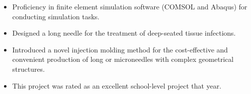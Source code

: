 \documentclass{resume}
\begin{document}
    \begin{itemize}
      \item Proficiency in finite element simulation software (COMSOL and Abaqus) for conducting simulation tasks.
      \item Designed a long needle for the treatment of deep-seated tissue infections.
      \item Introduced a novel injection molding method for the cost-effective and convenient production of long or microneedles with complex geometrical structures.
      \item This project was rated as an excellent school-level project that year.
    \end{itemize}
\end{document}
